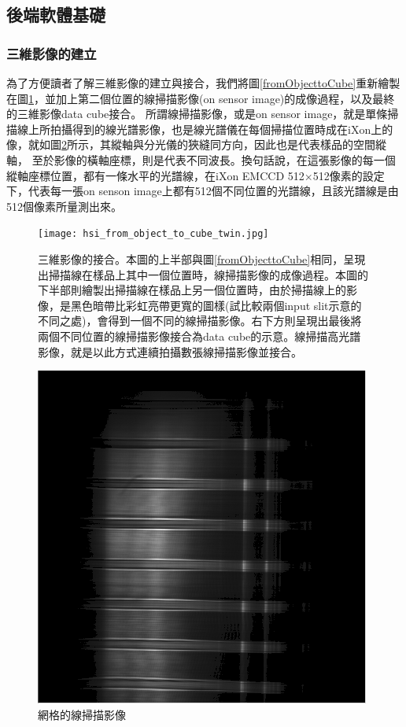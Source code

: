 \documentclass[12pt]{article}
\begin{document}
\subsection{後端軟體基礎}
\subsubsection{三維影像的建立}

為了方便讀者了解三維影像的建立與接合，我們將圖\ref{fromObjecttoCube}重新繪製在圖\ref{fig: form data cube}，並加上第二個位置的線掃描影像(on sensor image)的成像過程，以及最終的三維影像data cube接合。
所謂線掃描影像，或是on sensor image，就是單條掃描線上所拍攝得到的線光譜影像，也是線光譜儀在每個掃描位置時成在iXon上的像，就如圖\ref{figure: linespectrum}所示，其縱軸與分光儀的狹縫同方向，因此也是代表樣品的空間縱軸，
至於影像的橫軸座標，則是代表不同波長。換句話說，在這張影像的每一個縱軸座標位置，都有一條水平的光譜線，在iXon EMCCD 512$\times$512像素的設定下，代表每一張on senson image上都有512個不同位置的光譜線，且該光譜線是由512個像素所量測出來。

\begin{figure}
    \centering
    \texttt{[image: hsi\_from\_object\_to\_cube\_twin.jpg]}
    \caption[三維影像的接合]{三維影像的接合。本圖的上半部與圖\ref{fromObjecttoCube}相同，呈現出掃描線在樣品上其中一個位置時，線掃描影像的成像過程。本圖的下半部則繪製出掃描線在樣品上另一個位置時，由於掃描線上的影像，是黑色暗帶比彩虹亮帶更寬的圖樣(試比較兩個input slit示意的不同之處)，會得到一個不同的線掃描影像。右下方則呈現出最後將兩個不同位置的線掃描影像接合為data cube的示意。線掃描高光譜影像，就是以此方式連續拍攝數張線掃描影像並接合。}
    \label{fig: form data cube}
\end{figure}


\begin{figure}[h]
    \centering
    \includegraphics[width=0.5\linewidth]{lineSpectrum1213LDLS.png}
    \caption{網格的線掃描影像}
    \label{figure: linespectrum}
\end{figure}
\end{document}
